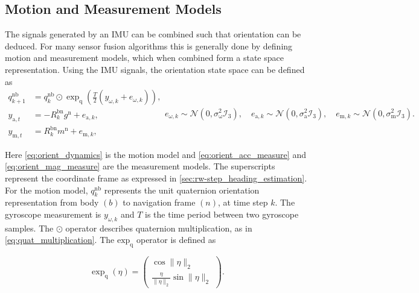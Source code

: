 \subsection{Motion and Measurement Models}
\label{sec:motion_and_measurement_models}
The signals generated by an \ac{IMU} can be combined such that orientation can be deduced. For many sensor fusion algorithms this is generally done by defining motion and measurement models, which when combined form a state space representation. Using the \ac{IMU} signals, the orientation state space can be defined \cite{Kok2017} as 
\begin{subequations}
	\begin{align}
		\label{eq:orient_dynamics}
		q_{k+1}^{\mathrm{nb}} &=q_{k}^{\mathrm{nb}} \odot \exp _{\mathrm{q}}\left(\frac{T}{2}\left(y_{\omega, k}+e_{\omega, k}\right)\right), 	\\ 
		\label{eq:orient_acc_measure}
		y_{\mathrm{a}, t} &=-R_{k}^{\mathrm{bn}} g^{\mathrm{n}}+e_{\mathrm{a}, k},\\ 
		\label{eq:orient_mag_measure}
		y_{\mathrm{m}, t} &=R_{k}^{\mathrm{bn}} m^{\mathrm{n}}+e_{\mathrm{m}, k}, 
	\end{align}
	\begin{equation}
		\label{eq:orient_ss_noise}
		e_{\omega, k} \sim \mathcal{N}\left(0, \sigma_{\mathrm{\omega}}^{2} \mathcal{I}_{3}\right), 
		\quad 
		e_{\mathrm{a}, k} \sim \mathcal{N}\left(0, \sigma_{\mathrm{a}}^{2} \mathcal{I}_{3}\right), 
		\quad 
		e_{\mathrm{m}, k} \sim \mathcal{N}\left(0, \sigma_{\mathrm{m}}^{2} \mathcal{I}_{3}\right).
	\end{equation}
	\label{eq:orient_state_space}
\end{subequations}

Here \eqref{eq:orient_dynamics} is the motion model and \eqref{eq:orient_acc_measure} and \eqref{eq:orient_mag_measure} are the measurement models. The superscripts represent the coordinate frame as expressed in \cref{sec:rw-step_heading_estimation}.
For the motion model, $q^{\mathrm{nb}}_k$ represents the unit quaternion orientation representation from body $(b)$ to navigation frame $(n)$, at time step $ k $.  The gyroscope measurement is $y_{\omega, k}$ and $T$ is the time period between two gyroscope samples. The $\odot$ operator describes quaternion multiplication, as in \eqref{eq:quat_multiplication}. The $\text{exp}_\text{q}$ operator is defined as

\begin{equation}
	\exp_\mathrm{q} (\eta) = \left(\begin{array}{c}{\cos \|\eta\|_{2}} \\ {\frac{\eta}{\|\eta\|_{2}} \sin \|\eta\|_{2}}\end{array}\right) \label{eq:exp_q_in_text}.
\end{equation}

